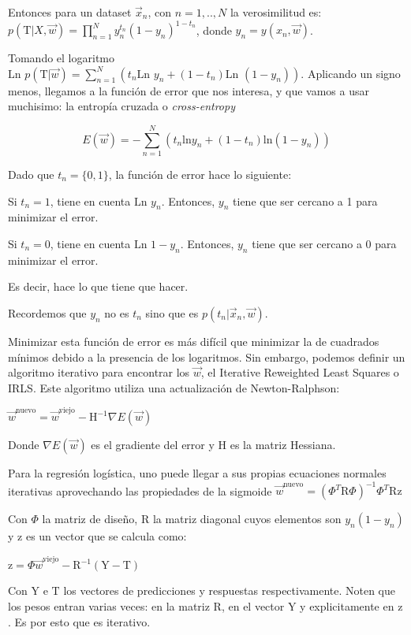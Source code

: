 \documentclass[twoside,11pt]{article}
\begin{document}
Entonces para un dataset $\vec{x}_{n}$, con $n=1,..,N$ la verosimilitud es:\\
$p(\text{T}|X,\vec{w})=\prod_{n=1}^{N}y^{t_n}_{n}(1-y_{n})^{1-t_n}$, donde $y_{n}=y(x_{n},\vec{w})$. 

Tomando el logaritmo 
$\text{Ln }p(\text{T}|\vec{w})=\sum_{n=1}^{N}(t_{n}\text{Ln }y_{n}+(1-t_{n})\text{Ln }(1-y_{n}))$. 
Aplicando un signo menos, llegamos a la función de error que nos interesa, y que vamos a usar muchisimo: 
la entropía cruzada o \textit{cross-entropy}

$$E(\vec{w})=-\sum_{n=1}^{N}(t_{n}\text{ln}y_{n}+(1-t_{n})\text{ln}(1-y_{n}))$$

Dado que $t_{n}=\{0,1\}$, la función de error hace lo siguiente:

Si $t_{n}=1$, tiene en cuenta $\text{Ln }y_{n}$.
Entonces, $y_{n}$ tiene que ser cercano a 1 para minimizar el error.

Si $t_{n}=0$, tiene en cuenta $\text{Ln }1-y_{n}$. 
Entonces, $y_{n}$ tiene que ser cercano a 0 para minimizar el error.

Es decir, hace lo que tiene que hacer. 

Recordemos que $y_{n}$ no es $t_{n}$ sino que es $p(t_{n}|\vec{x}_{n},\vec{w})$.

Minimizar esta función de error es más difícil que minimizar la de cuadrados mínimos debido a la presencia de los logaritmos. 
Sin embargo, podemos definir un algoritmo iterativo para encontrar los $\vec{w}$, el Iterative Reweighted Least Squares o IRLS. 
Este algoritmo utiliza una actualización de Newton-Ralphson:

$\vec{w}^{\text{nuevo}}=\vec{w}^{\text{viejo}}-\text{H}^{-1}\nabla E(\vec{w})$

Donde $\nabla E(\vec{w})$ es el gradiente del error y $\text{H}$ es la matriz Hessiana.

Para la regresión logística, uno puede llegar a sus propias ecuaciones normales iterativas 
aprovechando las propiedades de la sigmoide
$\vec{w}^{\text{nuevo}}=( \Phi^{T}\text{R}\Phi )^{-1}\Phi^{T}\text{R}\text{z}$

Con $\Phi$ la matriz de diseño, $\text{R}$ la matriz diagonal cuyos elementos son $y_{n}(1-y_{n})$ y $\text{z}$ 
es un vector que se calcula como:

$\text{z}=\Phi\vec{w}^{\text{viejo}}-\text{R}^{-1}(\text{Y}-\text{T})$

Con $\text{Y}$ e $\text{T}$ los vectores de predicciones y respuestas respectivamente. 
Noten que los pesos entran varias veces: en la matriz $\text{R}$, en el vector $\text{Y}$ y 
explicitamente en $\text{z}$. Es por esto que es iterativo.
\end{document}

